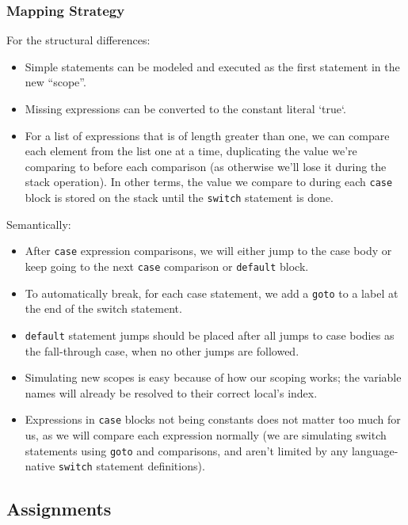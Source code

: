 \documentclass[11pt]{article}
\begin{document}
\subsubsection{Mapping Strategy}
\label{sec:orgfc4a7d4}
For the structural differences:
\begin{itemize}[noitemsep]
\item Simple statements can be modeled and executed as the first statement in
the new ``scope''.
\item Missing expressions can be converted to the constant literal `true`.
\item For a list of expressions that is of length greater than one, we
can compare each element from the list one at a time, duplicating the
value we're comparing to before each comparison (as otherwise
we'll lose it during the stack operation). In other terms, the value we
compare to during each \texttt{case} block is stored on the stack until the
\texttt{switch} statement is done.
\end{itemize}
Semantically:
\begin{itemize}[noitemsep]
\item After \texttt{case} expression comparisons, we will either jump to the case body
or keep going to the next \texttt{case} comparison or \texttt{default} block.
\item To automatically break, for each case statement, we add a \texttt{goto}
to a label at the end of the switch statement.
\item \texttt{default} statement jumps should be placed after all jumps to case bodies
as the fall-through case, when no other jumps are followed.
\item Simulating new scopes is easy because of how our scoping works;
the variable names will already be resolved to their correct local's
index.
\item Expressions in \texttt{case} blocks not being constants does not matter too much
for us, as we will compare each expression normally (we are
simulating switch statements using \texttt{goto} and comparisons, and aren't
limited by any language-native \texttt{switch} statement definitions).
\end{itemize}
\subsection{Assignments}
\label{sec:org8a9c192}
\end{document}
